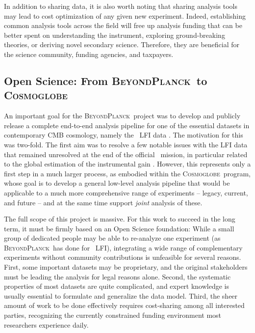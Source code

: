\documentclass[twocolumn]{aa}
\newcommand{\BP}{\textsc{BeyondPlanck}}
\newcommand{\cosmoglobe}{\textsc{Cosmoglobe}}
\begin{document}
In addition to sharing data, it is also worth noting that sharing analysis tools may lead to cost optimization of any given new experiment. Indeed, establishing common analysis tools across the field will free up analysis funding that can be better spent on understanding the instrument, exploring ground-breaking theories, or deriving novel secondary science. Therefore, they are beneficial for the science community, funding agencies, and taxpayers.

\subsection{Open Science: From \BP\ to \cosmoglobe}

An important goal for the \BP\ project was to develop and publicly release a complete end-to-end analysis pipeline for one of the essential datasets in contemporary CMB cosmology, namely the \Planck\ LFI data \citep{bp01}. The motivation for this was two-fold. The first aim was to resolve a few notable issues with the LFI data that remained unresolved at the end of the official \Planck\ mission, in particular related to the global estimation of the instrumental gain \citep{planck2016-l02,bp07}. However, this represents only a first step in a much larger process, as embodied within the \cosmoglobe\ program, whose goal is to develop a general low-level analysis pipeline that would be applicable to a much more comprehensive range of experiments -- legacy, current, and future -- and at the same time support \emph{joint} analysis of these.

The full scope of this project is massive. For this work to succeed in the long term, it must be firmly based on an Open Science foundation: While a small group of dedicated people may be able to re-analyze one experiment (as \BP\ has done for \Planck\ LFI), integrating a wide range of complementary experiments without community contributions is unfeasible for several reasons. First, some important datasets may be proprietary, and the original stakeholders must be leading the analysis for legal reasons alone. Second, the systematic properties of most datasets are quite complicated, and expert knowledge is usually essential to formulate and generalize the data model. Third, the sheer amount of work to be done effectively requires cost-sharing among all interested parties, recognizing the currently constrained funding environment most researchers experience daily.
\end{document}

